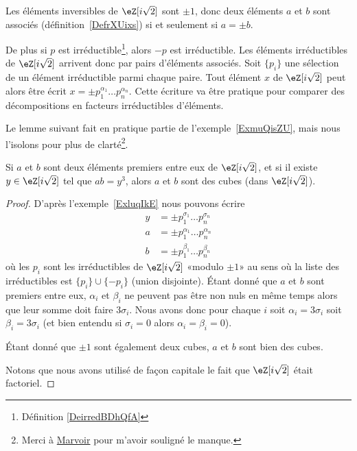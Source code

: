 \begin{example} \label{ExluqIkE}
	Les éléments inversibles de \( \eZ[i\sqrt{2}]\) sont \( \pm 1\), donc deux éléments \( a\) et \( b\) sont associés (définition~\ref{DefrXUixs}) si et seulement si \( a=\pm b\).

	De plus si \( p\) est irréductible\footnote{Définition \ref{DeirredBDhQfA}}, alors \( -p\) est irréductible. Les éléments irréductibles de \( \eZ[i\sqrt{2}]\) arrivent donc par pairs d'éléments associés. Soit \( \{ p_i \}\) une sélection de un élément irréductible parmi chaque paire. Tout élément \( x\) de \( \eZ[i\sqrt{2}]\) peut alors être écrit \( x=\pm p_1^{\alpha_1}\ldots p_n^{\alpha_n}\). Cette écriture va être pratique pour comparer des décompositions en facteurs irréductibles d'éléments.
\end{example}

Le lemme suivant fait en pratique partie de l'exemple~\ref{ExmuQisZU}, mais nous l'isolons pour plus de clarté\footnote{Merci à \href{http://fr.wikipedia.org/wiki/Utilisateur:Marvoir}{Marvoir} pour m'avoir souligné le manque.}.
\begin{lemma}       \label{LemTScCIv}
	Si \( a\) et \( b\) sont deux éléments premiers entre eux de \( \eZ[i\sqrt{2}]\), et si il existe \( y \in  \eZ[i\sqrt{2}]\) tel que \( ab=y^3\), alors \( a\) et \( b\) sont des cubes (dans \( \eZ[i\sqrt{2}]\)).
\end{lemma}

\begin{proof}
	D'après l'exemple~\ref{ExluqIkE} nous pouvons écrire
	\begin{subequations}
		\begin{align}
			y & =\pm p_1^{\sigma_1}\ldots p_n^{\sigma_n} \\
			a & =\pm p_1^{\alpha_1}\ldots p_n^{\alpha_n} \\
			b & =\pm p_1^{\beta_1}\ldots p_n^{\beta_n}
		\end{align}
	\end{subequations}
	où les \( p_i\) sont les irréductibles de \( \eZ[i\sqrt{2}]\) «modulo \( \pm 1\)» au sens où la liste des irréductibles est \( \{ p_i \}\cup\{ -p_i \}\) (union disjointe). Étant donné que \( a\) et \( b\) sont premiers entre eux, \( \alpha_i\) et \( \beta_i\) ne peuvent pas être non nuls en même temps alors que leur somme doit faire \( 3\sigma_i\). Nous avons donc pour chaque \( i\) soit \( \alpha_i=3\sigma_i\) soit \( \beta_i=3\sigma_i\) (et bien entendu si \( \sigma_i=0\) alors \( \alpha_i=\beta_i=0\)).

	Étant donné que \( \pm 1\) sont également deux cubes, \( a\) et \( b\) sont bien des cubes.

	Notons que nous avons utilisé de façon capitale le fait que \( \eZ[i\sqrt{2}]\) était factoriel.
\end{proof}

